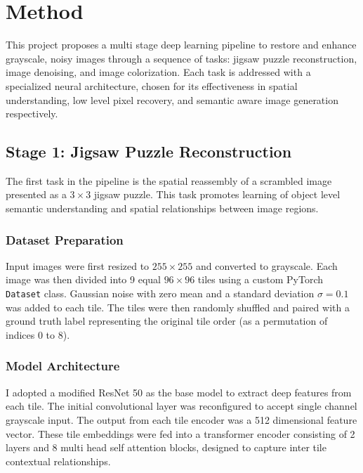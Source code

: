 \documentclass[%
 reprint,
 amsmath,amssymb,
 aps,
]{revtex4-2}
\begin{document}
\section{\label{sec:method}Method} %

This project proposes a multi stage deep learning pipeline to restore and enhance grayscale, noisy images through a sequence of tasks: jigsaw puzzle reconstruction, image denoising, and image colorization. Each task is addressed with a specialized neural architecture, chosen for its effectiveness in spatial understanding, low level pixel recovery, and semantic aware image generation respectively.

\subsection{Stage 1: Jigsaw Puzzle Reconstruction}

The first task in the pipeline is the spatial reassembly of a scrambled image presented as a $3\times3$ jigsaw puzzle. This task promotes learning of object level semantic understanding and spatial relationships between image regions. 

\subsubsection{Dataset Preparation}

Input images were first resized to $255\times255$ and converted to grayscale. Each image was then divided into 9 equal $96\times96$ tiles using a custom PyTorch \texttt{Dataset} class. Gaussian noise with zero mean and a standard deviation $\sigma = 0.1$ was added to each tile. The tiles were then randomly shuffled and paired with a ground truth label representing the original tile order (as a permutation of indices 0 to 8).

\subsubsection{Model Architecture}

I adopted a modified ResNet 50 as the base model to extract deep features from each tile. The initial convolutional layer was reconfigured to accept single channel grayscale input. The output from each tile encoder was a 512 dimensional feature vector. These tile embeddings were fed into a transformer encoder consisting of 2 layers and 8 multi head self attention blocks, designed to capture inter tile contextual relationships.
\end{document}
